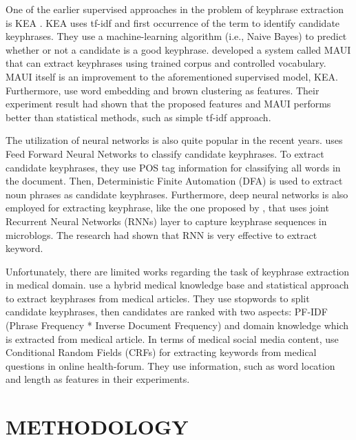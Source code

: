 One of the earlier supervised approaches in the problem of keyphrase extraction is KEA \cite{witten1999kea}. KEA uses tf-idf and first occurrence of the term to identify candidate keyphrases. They use a machine-learning algorithm (i.e., Naive Bayes) to predict whether or not a candidate is a good keyphrase. \cite{medelyan2009human} developed a system called MAUI that can extract keyphrases using trained corpus and controlled vocabulary. MAUI itself is an improvement to the aforementioned supervised model, KEA. Furthermore, \cite{marujoMAUI} use word embedding and brown clustering as features. Their experiment result had shown that the proposed features and MAUI performs better than statistical methods, such as simple tf-idf approach.

The utilization of neural networks is also quite popular in the recent years. \cite{ekpNeuralNetworks} uses Feed Forward Neural Networks to classify candidate keyphrases. To extract candidate keyphrases, they use POS tag information for classifying all words in the document. Then, Deterministic Finite Automation (DFA) is used to extract noun phrases as candidate keyphrases. Furthermore, deep neural networks is also employed for extracting keyphrase, like the one proposed by \cite{zhang2016keyphrase}, that uses joint Recurrent Neural Networks (RNNs) layer to capture keyphrase sequences in microblogs. The research had shown that RNN is very effective to extract keyword.

Unfortunately, there are limited works regarding the task of keyphrase extraction in medical domain. \cite{ekpMedicalDocumentHybrid} use a hybrid medical knowledge base and statistical approach to extract keyphrases from medical articles. They use stopwords to split candidate keyphrases, then candidates are ranked with two aspects: PF-IDF (Phrase Frequency * Inverse Document Frequency) and domain knowledge which is extracted from medical article. In terms of medical social media content, \cite{cao2010automatically} use Conditional Random Fields (CRFs) for extracting keywords from medical questions in online health-forum. They use information, such as word location and length as features in their experiments.
\fi
\section{METHODOLOGY}

\iffalse
